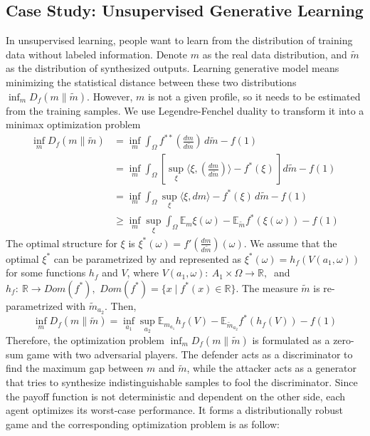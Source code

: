 \documentclass{article}
\begin{document}
\subsection{Case Study: Unsupervised Generative Learning}
\label{subsec:GAN}
In unsupervised learning, people want to learn from the distribution of training data without labeled information. Denote $m$ as the real data distribution, and $\tilde{m}$ as the distribution of synthesized outputs. Learning generative model means minimizing the statistical distance between these two distributions $\inf_{m}D_f(m\parallel \tilde{m})$. However, $m$ is not a given profile, so it needs to be estimated from the training samples. We use Legendre-Fenchel duality to transform it into a minimax optimization problem
\begin{equation}
\begin{aligned}
\inf_{m}D_f(m\parallel \tilde{m} ) &= \inf_{m}\int_{\Omega} f^{**}\left(\frac{dm}{d\tilde{m}}\right)\,d\tilde{m} -f(1) \\
&= \inf_{m} \int_{\Omega}[ \sup_{\xi} \langle \xi, \left(\frac{dm}{d\tilde{m}}\right)\rangle -f^*(\xi)\, ]d\tilde{m} -f(1) \\
&= \inf_{m} \int_{\Omega}\sup_{\xi} \langle \xi, dm \rangle - f^*(\xi)\, d\tilde{m} -f(1) \\
&\geq \inf_{m} \sup_{\xi} \int_{\Omega}\mathbb{E}_{m} \xi(\omega) - \mathbb{E}_{\tilde{m}}f^*(\xi(\omega))-f(1)
\end{aligned}
\end{equation}
The optimal structure for $\xi$ is $\xi^*(\omega)=f'(\frac{dm}{d\tilde{m}})(\omega)$. We assume that the optimal $\xi^*$  can be parametrized by and represented as $ \xi^*(\omega)=h_f(V(a_1,\omega) )$ for some functions $h_f$ and $V$, where $V(a_1,\omega): \ A_1\times \Omega \rightarrow \mathbb{R},\ $ and $h_f:\ \mathbb{R} \rightarrow Dom(f^*), $ $Dom(f^*)=\{ x \mid f^*(x) \in \mathbb{R}\}$. The measure $\tilde{m}$ is re-parametrized with $\tilde{m}_{a_2}$. Then,
\begin{equation}
\inf_{m}D_f(m\parallel \tilde{m}) = \inf_{a_1} \sup_{a_2} \mathbb{E}_{m_{a_1}} h_f(V) -  \mathbb{E}_{\tilde{m}_{a_2}}f^*(h_f(V))-f(1)
\end{equation}
Therefore, the optimization problem $\inf_{m}D_f(m\parallel \tilde{m})$ is formulated as a zero-sum game with two adversarial players. The defender acts as a discriminator to find the maximum gap between $m$ and $\tilde{m}$, while the attacker acts as a generator that tries to synthesize indistinguishable samples to fool the discriminator. Since the payoff function is not deterministic and dependent on the other side, each agent optimizes its worst-case performance. It forms a distributionally robust game and the corresponding optimization problem is as follow:
\end{document}
